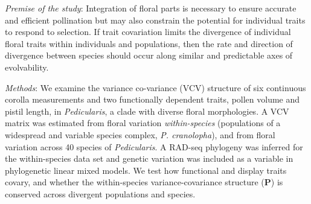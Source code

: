 \documentclass[12pt,letterpaper]{article}
\def\P{\emph{Pedicularis}}
\def\PM{{\bf P}}
\begin{document}
\begin{itemize}
\small{
\item \emph{Premise of the study}: Integration of floral parts is necessary to ensure accurate and efficient pollination but may also constrain the potential for individual traits to respond to selection. If trait covariation limits the divergence of individual floral traits within individuals and populations, then the rate and direction of divergence between species should occur along similar and predictable axes of evolvability. 



\item \emph{Methods}: We examine the variance co-variance (VCV) structure of six continuous corolla measurements and two functionally dependent traits, pollen volume and pistil length, in \emph{Pedicularis}, a clade with diverse floral morphologies. A VCV matrix was estimated from floral variation \emph{within-species} (populations of a widespread and variable species complex, \emph{P. cranolopha}), and from floral variation across 40 species of \emph{Pedicularis}. A RAD-seq phylogeny was inferred for the within-species data set and genetic variation was included as a variable in phylogenetic linear mixed models. We test how functional and display traits covary, and whether the within-species variance-covariance structure (\PM) is conserved across divergent populations and species. 

}
\end{itemize}
\end{document}

